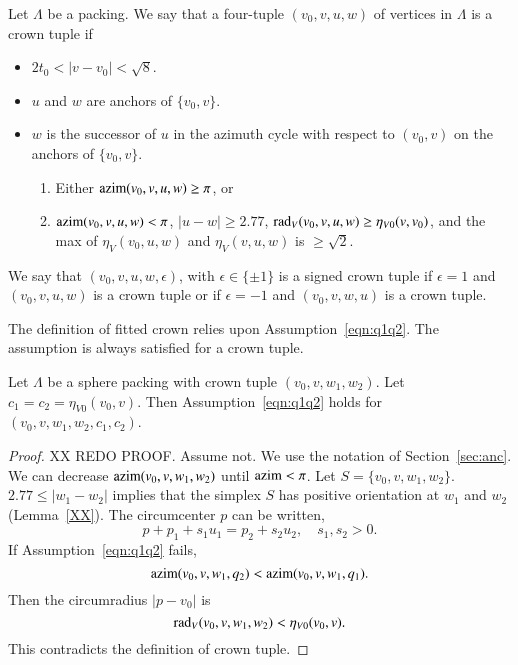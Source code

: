\begin{definition}\label{def:crown-tuple}
Let $\Lambda$ be a packing.
We say that a four-tuple $(v_0,v,u,w)$ of vertices in $\Lambda$   
is a crown tuple if
\begin{itemize}
  \item $2t_0 < |v-v_0| <\sqrt8$.
  \item $u$ and $w$ are anchors of $\{v_0,v\}$.
  \item $w$ is the successor of $u$ in the azimuth cycle with respect to
   $(v_0,v)$ on the
   anchors of $\{v_0,v\}$.
\begin{enumerate}  
    \item Either ${\operatorname{azim}}(v_0,v,u,w)\ge\pi$, or
    \item ${\operatorname{azim}}(v_0,v,u,w) <\pi$, 
 $|u-w|\ge 2.77$,
    $\operatorname{rad}_V(v_0,v,u,w)\ge\eta_{V0}(v,v_0)$, and the max of 
    $\eta_V(v_0,u,w)$ and $\eta_V(v,u,w)$ is
    $\ge\sqrt2$.
    \label{enum:wedge2}
\end{enumerate}
\end{itemize}
We say that $(v_0,v,u,w,\epsilon)$, with $\epsilon\in\{\pm1\}$ is
a signed crown tuple if $\epsilon=1$ and $(v_0,v,u,w)$ is a crown tuple
or if $\epsilon=-1$ and $(v_0,v,w,u)$ is a crown tuple.
\end{definition}

The definition of fitted crown relies upon Assumption~\ref{eqn:q1q2}.
The assumption is always satisfied for a crown tuple.

\begin{lemma}
Let $\Lambda$ be a sphere packing with crown tuple
$(v_0,v,w_1,w_2)$.  Let $c_1=c_2=\eta_{V0}(v_0,v)$. 
Then Assumption~\ref{eqn:q1q2} holds for $(v_0,v,w_1,w_2,c_1,c_2)$.
\end{lemma}

\begin{proof} XX REDO PROOF. Assume not.  
We use the notation of Section~\ref{sec:anc}.
We can decrease ${\operatorname{azim}}(v_0,v,w_1,w_2)$
until ${\operatorname{azim}}<\pi$.  Let $S=\{v_0,v,w_1,w_2\}$.
$2.77 \le |w_1-w_2|$ implies that the simplex $S$
has positive orientation at $w_1$ and $w_2$ (Lemma~\ref{XX}). 
The circumcenter $p$ can be written, 
   $$p + p_1 + s_1 u_1 = p_2 + s_2 u_2,\quad s_1,s_2 > 0.$$
If Assumption~\ref{eqn:q1q2} fails,
   $${\operatorname{azim}}(v_0,v,w_1,q_2) < {\operatorname{azim}}(v_0,v,w_1,q_1).$$
Then the circumradius $|p-v_0|$ is
   $$\operatorname{rad}_V(v_0,v,w_1,w_2) < \eta_{V0}(v_0,v).$$
This contradicts the definition of crown tuple.
\end{proof}



